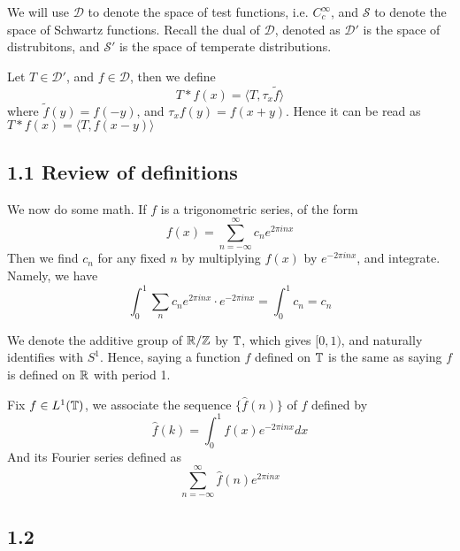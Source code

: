 We will use $\mathcal{D}$ to denote the space of test functions, i.e. $C_c^\infty$, and $\mathcal{S}$ to denote the space of Schwartz functions. Recall the dual of $\mathcal{D}$, denoted as $\mathcal{D}'$ is the space of distrubitons, and $\mathcal{S}'$ is the space of temperate distributions.

\begin{definition}
    Let $T\in\mathcal{D}'$, and $f\in\mathcal{D}$, then we define
    \begin{equation*}
        T\ast f(x)=\langle T, \tau_x\tilde{f}\rangle
    \end{equation*}
    where $\tilde{f}(y)=f(-y)$, and $\tau_xf(y)=f(x+y)$. Hence it can be read as $T\ast f(x)=\langle T, f(x-y)\rangle$
\end{definition}
\begin{comment}
The theory of distribution will come in when we need meaningful differentiation but derivatives don't exist in the classical sense.
\end{comment}
\begin{comment}
    Tradionally, functions are thought of as sending points to points, but distributions are linear functions that act on a test function and send it to a point. In other words, distributions send functions to points using $\phi\mapsto\int u\phi dx$.
\end{comment}

\subsection{1.1 Review of definitions}
We now do some math.
If $f$ is a trigonometric series, of the form
\begin{equation*}
    f(x)=\sum_{n=-\infty}^\infty c_ne^{2\pi inx}
\end{equation*}
Then we find $c_n$ for any fixed $n$ by multiplying $f(x)$ by $e^{-2\pi inx}$, and integrate. Namely, we have
\begin{equation*}
    \int_0^1\sum_nc_ne^{2\pi inx}\cdot e^{-2\pi inx}=\int_0^1 c_n=c_n
\end{equation*}

We denote the additive group of $\mathbb{R}/\mathbb{Z}$ by $\mathbb{T}$, which gives $[0,1)$, and naturally identifies with $S^1$. Hence, saying a function $f$ defined on $\mathbb{T}$ is the same as saying $f$ is defined on $\mathbb{R}$ with period 1.

\begin{definition}
    Fix $f\in L^1(\mathbb{T})$, we associate the sequence $\{\hat{f}(n)\}$ of $f$ defined by
    \begin{equation*}
        \hat{f}(k)=\int_0^1f(x)e^{-2\pi inx}dx
    \end{equation*}
    And its Fourier series defined as
    \begin{equation*}
        \sum_{n=-\infty}^\infty \hat{f}(n)e^{2\pi inx}
    \end{equation*}
\end{definition}


\subsection{1.2}

